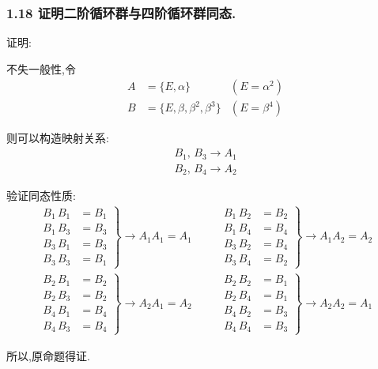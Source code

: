     \subsubsection{1.18 \textnormal{证明二阶循环群与四阶循环群同态}.}
    {\color{hwSolution}
    \noindent 证明:

        不失一般性,令
        \begin{align*}
            A&=\{E,\alpha\}&(E=\alpha^2)\\
            B&=\{E,\beta,\beta^2,\beta^3\}&(E=\beta^4)
        \end{align*}

        则可以构造映射关系:
        \begin{align*}
            B_1,\,B_3 \rightarrow A_1\\
            B_2,\,B_4 \rightarrow A_2
        \end{align*}

        验证同态性质:
        \begin{align*}
            \left.\begin{array}{rl}
                B_1\,B_1 &= B_1\\
                B_1\,B_3 &= B_3\\
                B_3\,B_1 &= B_3\\
                B_3\,B_3 &= B_1
            \end{array}\right\}
            \rightarrow A_1A_1 = A_1 &~~~~&
            \left.\begin{array}{rl}
                B_1\,B_2 &= B_2\\
                B_1\,B_4 &= B_4\\
                B_3\,B_2 &= B_4\\
                B_3\,B_4 &= B_2
            \end{array}\right\}
            \rightarrow A_1A_2 = A_2\\
            \left.\begin{array}{rl}
                B_2\,B_1 &= B_2\\
                B_2\,B_3 &= B_2\\
                B_4\,B_1 &= B_4\\
                B_4\,B_3 &= B_4
            \end{array}\right\}
            \rightarrow A_2A_1 = A_2 &~~~~&
            \left.\begin{array}{rl}
                B_2\,B_2 &= B_1\\
                B_2\,B_4 &= B_1\\
                B_4\,B_2 &= B_3\\
                B_4\,B_4 &= B_3
            \end{array}\right\}
            \rightarrow A_2A_2 = A_1
        \end{align*}

        所以,原命题得证.
    }

